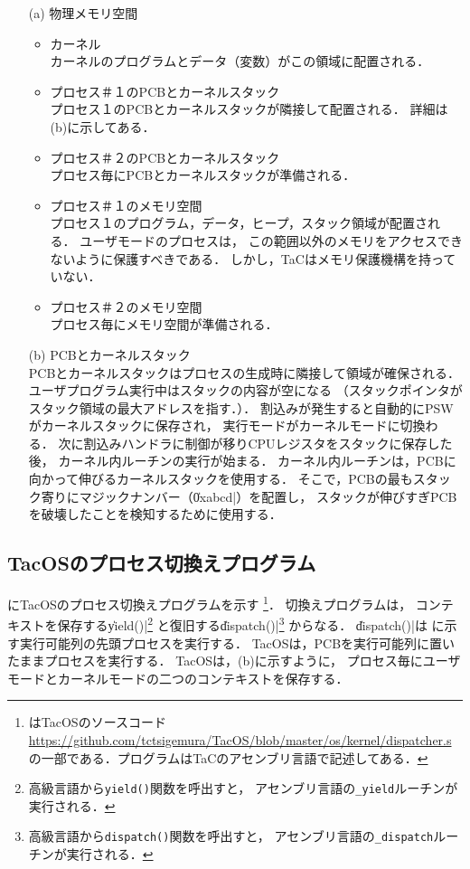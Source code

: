 \begin{enumerate}
\item[(a)] 物理メモリ空間

\begin{itemize}
\item カーネル \\
カーネルのプログラムとデータ（変数）がこの領域に配置される．

\item プロセス＃１のPCBとカーネルスタック \\
プロセス１のPCBとカーネルスタックが隣接して配置される．
詳細は(b)に示してある．

\item プロセス＃２のPCBとカーネルスタック \\
プロセス毎にPCBとカーネルスタックが準備される．

\item プロセス＃１のメモリ空間 \\
プロセス１のプログラム，データ，ヒープ，スタック領域が配置される．
ユーザモードのプロセスは，
この範囲以外のメモリをアクセスできないように保護すべきである．
しかし，TaCはメモリ保護機構を持っていない．

\item プロセス＃２のメモリ空間 \\
プロセス毎にメモリ空間が準備される．
\end{itemize}

\item[(b)] PCBとカーネルスタック \\
PCBとカーネルスタックはプロセスの生成時に隣接して領域が確保される．
ユーザプログラム実行中はスタックの内容が空になる
（スタックポインタがスタック領域の最大アドレスを指す．）．
割込みが発生すると自動的にPSWがカーネルスタックに保存され，
実行モードがカーネルモードに切換わる．
次に割込みハンドラに制御が移りCPUレジスタをスタックに保存した後，
カーネル内ルーチンの実行が始まる．
カーネル内ルーチンは，PCBに向かって伸びるカーネルスタックを使用する．
そこで，PCBの最もスタック寄りにマジックナンバー（\|0xabcd|）を配置し，
スタックが伸びすぎPCBを破壊したことを検知するために使用する．
\end{enumerate}

\subsection{TacOSのプロセス切換えプログラム}
にTacOSのプロセス切換えプログラムを示す
\footnote{はTacOSのソースコード
\url{https://github.com/tctsigemura/TacOS/blob/master/os/kernel/dispatcher.s}
の一部である．プログラムはTaCのアセンブリ言語で記述してある．}．
切換えプログラムは，
コンテキストを保存する\|yield()|\footnote{
高級言語から{\tt yield()}関数を呼出すと，
アセンブリ言語の{\tt \_yield}ルーチンが実行される．}
と復旧する\|dispatch()|\footnote{
高級言語から{\tt dispatch()}関数を呼出すと，
アセンブリ言語の{\tt \_dispatch}ルーチンが実行される．}
からなる．
\|dispatch()|は
に示す実行可能列の先頭プロセスを実行する．
TacOSは，PCBを実行可能列に置いたままプロセスを実行する．
TacOSは，(b)に示すように，
プロセス毎にユーザモードとカーネルモードの二つのコンテキストを保存する．

